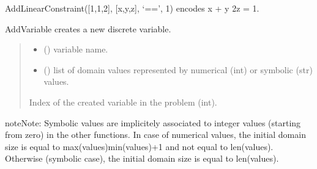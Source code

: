 \documentclass[letterpaper,10pt,openany,oneside,english]{sphinxmanual}
\begin{document}
\begin{fulllineitems}
\begin{fulllineitems}
\sphinxAtStartPar
AddLinearConstraint({[}1,1,\sphinxhyphen{}2{]}, {[}x,y,z{]}, ‘==’, \sphinxhyphen{}1) encodes x + y \sphinxhyphen{}2z = \sphinxhyphen{}1.

\end{fulllineitems}


\begin{fulllineitems}
\label{\detokenize{ref/ref_python:pytoulbar2.CFN.AddVariable}}
\pysigstartsignatures
{}
\pysigstopsignatures
\sphinxAtStartPar
AddVariable creates a new discrete variable.
\begin{quote}\begin{description}
\begin{itemize}
\item {} 
\sphinxAtStartPar
{} () \textendash{} variable name.

\item {} 
\sphinxAtStartPar
{} () \textendash{} list of domain values represented by numerical (int) or symbolic (str) values.

\end{itemize}

\sphinxAtStartPar
Index of the created variable in the problem (int).

\end{description}\end{quote}

\begin{sphinxadmonition}{note}{Note:}
\sphinxAtStartPar
Symbolic values are implicitely associated to integer values (starting from zero) in the other functions.
In case of numerical values, the initial domain size is equal to max(values)\sphinxhyphen{}min(values)+1 and not equal to len(values).
Otherwise (symbolic case), the initial domain size is equal to len(values).
\end{sphinxadmonition}

\end{fulllineitems}


\end{fulllineitems}
\end{document}
